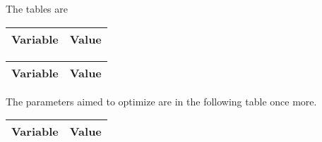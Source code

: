 \clearpage

The tables are 

\begin{center}
    \begin{tabular}{|l|r|}
      \hline    
      {\bf Variable} & {\bf Value} \\ \hline
      
    \end{tabular}
\end{center}

\begin{center}
    \begin{tabular}{|l|r|}
    \hline    
    {\bf Variable} & {\bf Value} \\ \hline
    
    \end{tabular}
\end{center}

The parameters aimed to optimize are in the following table once more.

\begin{center}
    \begin{tabular}{|l|r|}
      \hline    
      {\bf Variable} & {\bf Value} \\ \hline
      
    \end{tabular}
\end{center}



